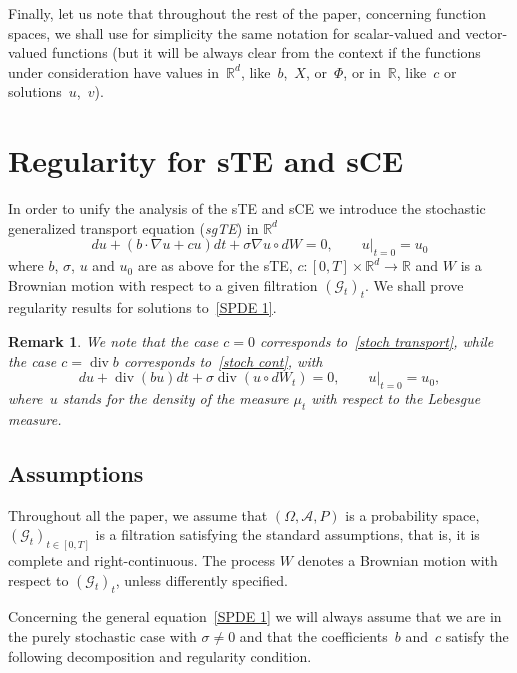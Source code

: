 \documentclass[a4paper,10pt]{article}
\newtheorem{remark}[theorem]{Remark}
\newcommand\1{\mathbbm{1}}
\newcommand{\mc}{\mathcal}
\DeclareMathOperator{\diverg}{div}
\numberwithin{equation}{section}
\begin{document}
Finally, let us note that throughout the rest of the paper, concerning function spaces, we shall use for simplicity the same notation for scalar-valued and vector-valued functions (but it will be always clear from the context if the functions under consideration have values in~$\mathbb{R}^{d}$, like~$b$,~$X$,  or~$\Phi$, or in~$\mathbb{R}$, like~$c$ or solutions~$u$,~$v$).


\section{Regularity for sTE and sCE\label{section regularity}}

In order to unify the analysis of the sTE and sCE we introduce the stochastic generalized transport equation (\textit{sgTE}) in $\mathbb{R}^{d}$
\begin{equation}
\tag{sgTE}
du+(b\cdot\nabla u+cu)  dt+\sigma\nabla u\circ dW=0,\qquad
u|_{t=0}=u_{0} \label{SPDE 1} 
\end{equation}
where $b$, $\sigma$, $u$ and $u_{0}$ are as above for the sTE, $c \colon [0,T] \times\mathbb{R}^{d}\rightarrow\mathbb{R}$ and $W$ is a Brownian motion with respect to a given filtration $(\mc{G}_t)_t$. We shall prove regularity results for solutions to~\eqref{SPDE 1}.

\begin{remark}
We note that the case $c=0$ corresponds to~\eqref{stoch transport}, while the case $c=\diverg b$ corresponds to~\eqref{stoch cont}, with
\begin{equation}
du+\diverg  (bu)  dt+\sigma\diverg  
(  u\circ dW_{t} )  =0,\qquad u|_{t=0}=u_{0},
\label{sCE for density}
\end{equation}
where~$u$ stands for the density of the measure $\mu_t$ with respect to the Lebesgue measure.
\end{remark}

\subsection{Assumptions\label{subsection regularity assumptions}}

Throughout all the paper, we assume that $(\Omega,\mathcal{A},P)$ is a probability space, $(\mathcal{G}_t)_{t\in[0,T]}$ is a filtration satisfying the standard assumptions, that is, it is complete and right-continuous. The process $W$ denotes a Brownian motion with respect to $(\mathcal{G}_t)_t$, unless differently specified.

Concerning the general equation~\eqref{SPDE 1} we will always assume that we are in the purely stochastic case with $\sigma\neq0$ and that the coefficients~$b$ and~$c$ satisfy the following decomposition and regularity condition.
\end{document}
